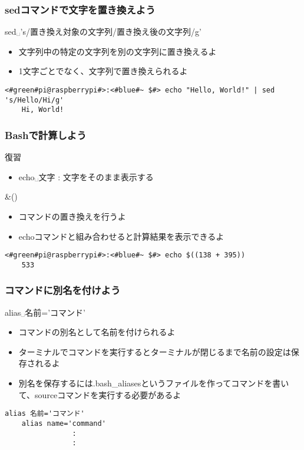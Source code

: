 \begin{frame}[fragile]
    \frametitle{sedコマンドで文字を置き換えよう}
    sed␣'s/置き換え対象の文字列/置き換え後の文字列/g'
    \begin{itemize}
        \item 文字列中の特定の文字列を別の文字列に置き換えるよ
        \item 1文字ごとでなく、文字列で置き換えられるよ
    \end{itemize}
    \begin{lstlisting}[title=sed sedでの文字の置き換え, label=sed_app]
    <#green#pi@raspberrypi#>:<#blue#~ $#> echo "Hello, World!" | sed 's/Hello/Hi/g'
    Hi, World!
    \end{lstlisting}
\end{frame}

\begin{frame}[fragile]
    \frametitle{Bashで計算しよう}
    復習
    \begin{itemize}
        \item echo␣文字 : 文字をそのまま表示する
    \end{itemize}
    \&()
    \begin{itemize}
        \item コマンドの置き換えを行うよ
        \item echoコマンドと組み合わせると計算結果を表示できるよ
    \end{itemize}
    \begin{lstlisting}[title=echo コマンドでの計算, label=cmdsbs:calc]
    <#green#pi@raspberrypi#>:<#blue#~ $#> echo $((138 + 395))
    533
    \end{lstlisting}
        
\end{frame}

\begin{frame}[fragile]
    \frametitle{コマンドに別名を付けよう}
    alias␣名前='コマンド'
    \begin{itemize}
        \item コマンドの別名として名前を付けられるよ
    \end{itemize}
    \begin{itemize}
        \item ターミナルでコマンドを実行するとターミナルが閉じるまで名前の設定は保存されるよ
        \item 別名を保存するには.bash\_aliasesというファイルを作ってコマンドを書いて、sourceコマンドを実行する必要があるよ
    \end{itemize}
    \begin{lstlisting}[title=\textasciitilde/.bash\_aliasesの書き方, label=bashAliasesGrammar1]
    alias 名前='コマンド'
    alias name='command'
                :
                :
    \end{lstlisting}
\end{frame}
